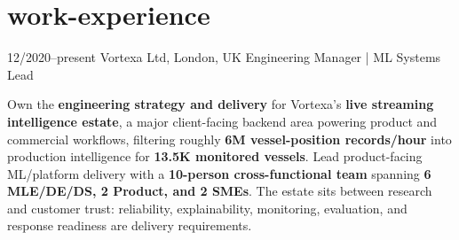 \documentclass[]{../../friggeri-cv}
\begin{document}
\section{work-experience}
\begin{entrylist}
	\entry
	{12/2020–present}
	{Vortexa Ltd, London, UK}
		{Engineering Manager | ML Systems Lead}
	{
    	{\small
	    \setlength{\parindent}{0pt}
	    \setlength{\leftskip}{0pt}
								    Own the \textbf{engineering strategy and delivery} for Vortexa's \textbf{live streaming intelligence estate}, a major client-facing backend area powering product and commercial workflows, filtering roughly \textbf{6M vessel-position records/hour} into production intelligence for \textbf{13.5K monitored vessels}. Lead product-facing ML/platform delivery with a \textbf{10-person cross-functional team} spanning \textbf{6 MLE/DE/DS, 2 Product, and 2 SMEs}. The estate sits between research and customer trust: reliability, explainability, monitoring, evaluation, and response readiness are delivery requirements.

}}
\end{entrylist}
\end{document}
